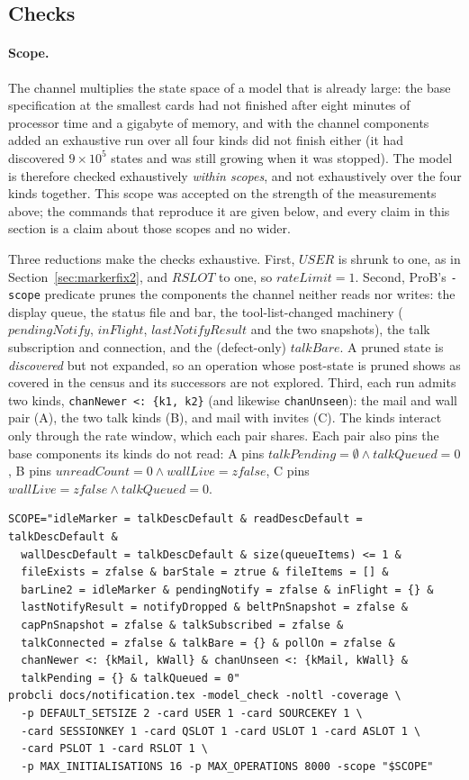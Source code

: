 \documentclass[a4paper,10pt,fleqn]{article}
\begin{document}
\subsection{Checks}
\label{sec:chanchecks}

\paragraph{Scope.}  The channel multiplies the state space of a model that
is already large: the base specification at the smallest cards had not
finished after eight minutes of processor time and a gigabyte of memory,
and with the channel components added an exhaustive run over all four kinds
did not finish either (it had discovered $9 \times 10^5$ states and was
still growing when it was stopped).  The model is therefore checked
exhaustively \emph{within scopes}, and not exhaustively over the four kinds
together.  This scope was accepted on the strength of the measurements above;
the commands that reproduce it are given below, and every claim in this
section is a claim about those scopes and no wider.

Three reductions make the checks exhaustive.  First, $USER$ is shrunk to one,
as in Section~\ref{sec:markerfix2}, and $RSLOT$ to one, so $rateLimit = 1$.
Second, ProB's \texttt{-scope} predicate prunes the components the channel
neither reads nor writes: the display queue, the status file and bar, the
tool-list-changed machinery ($pendingNotify$, $inFlight$,
$lastNotifyResult$ and the two snapshots), the talk subscription and
connection, and the (defect-only) $talkBare$.  A pruned state is
\emph{discovered} but not expanded, so an operation whose post-state is
pruned shows as covered in the census and its successors are not explored.
Third, each run admits two kinds, \texttt{chanNewer <: \{k1, k2\}} (and
likewise \texttt{chanUnseen}): the mail and wall pair (A), the two talk kinds
(B), and mail with invites (C).  The kinds interact only through the rate
window, which each pair shares.  Each pair also pins the base components its
kinds do not read: A pins $talkPending = \emptyset \land talkQueued = 0$, B
pins $unreadCount = 0 \land wallLive = zfalse$, C pins $wallLive = zfalse
\land talkQueued = 0$.

\begin{verbatim}
SCOPE="idleMarker = talkDescDefault & readDescDefault = talkDescDefault &
  wallDescDefault = talkDescDefault & size(queueItems) <= 1 &
  fileExists = zfalse & barStale = ztrue & fileItems = [] &
  barLine2 = idleMarker & pendingNotify = zfalse & inFlight = {} &
  lastNotifyResult = notifyDropped & beltPnSnapshot = zfalse &
  capPnSnapshot = zfalse & talkSubscribed = zfalse &
  talkConnected = zfalse & talkBare = {} & pollOn = zfalse &
  chanNewer <: {kMail, kWall} & chanUnseen <: {kMail, kWall} &
  talkPending = {} & talkQueued = 0"
probcli docs/notification.tex -model_check -noltl -coverage \
  -p DEFAULT_SETSIZE 2 -card USER 1 -card SOURCEKEY 1 \
  -card SESSIONKEY 1 -card QSLOT 1 -card USLOT 1 -card ASLOT 1 \
  -card PSLOT 1 -card RSLOT 1 \
  -p MAX_INITIALISATIONS 16 -p MAX_OPERATIONS 8000 -scope "$SCOPE"
\end{verbatim}
\end{document}
